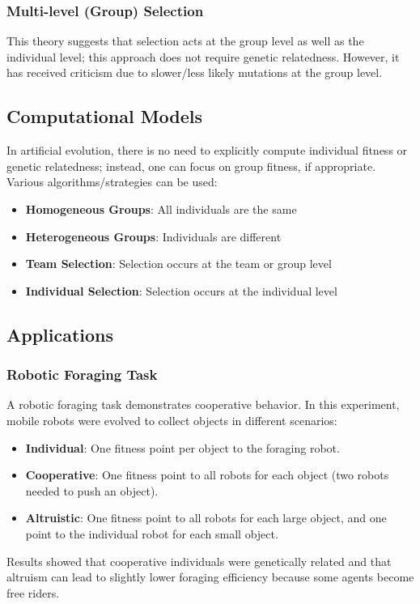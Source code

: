 \subsubsection*{Multi-level (Group) Selection}
This theory suggests that selection acts at the group level as well as the individual level; this approach does not require genetic relatedness.  However, it has received criticism due to slower/less likely mutations at the group level.

\subsection*{Computational Models}
In artificial evolution, there is no need to explicitly compute individual fitness or genetic relatedness; instead, one can focus on group fitness, if appropriate.  Various algorithms/strategies can be used:
\begin{itemize}
    \item \textbf{Homogeneous Groups}: All individuals are the same
    \item \textbf{Heterogeneous Groups}: Individuals are different
    \item \textbf{Team Selection}: Selection occurs at the team or group level
    \item \textbf{Individual Selection}: Selection occurs at the individual level
\end{itemize}

\subsection*{Applications}

\subsubsection*{Robotic Foraging Task}

A robotic foraging task demonstrates cooperative behavior. In this experiment, mobile robots were evolved to collect objects in different scenarios:
\begin{itemize}
    \item \textbf{Individual}: One fitness point per object to the foraging robot.
    \item \textbf{Cooperative}: One fitness point to all robots for each object (two robots needed to push an object).
    \item \textbf{Altruistic}: One fitness point to all robots for each large object, and one point to the individual robot for each small object.
\end{itemize}
Results showed that cooperative individuals were genetically related and that altruism can lead to slightly lower foraging efficiency because some agents become free riders.

